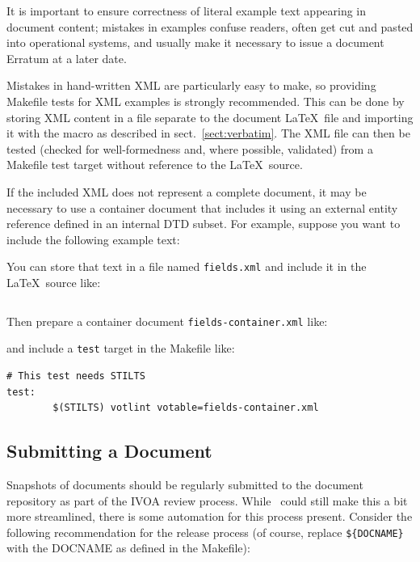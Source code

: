 \documentclass[11pt,a4paper]{ivoa}
\begin{document}
It is important to ensure correctness of literal example text appearing
in document content;
mistakes in examples confuse readers,
often get cut and pasted into operational systems,
and usually make it necessary to issue a document Erratum at a later date.

Mistakes in hand-written XML are particularly easy to make,
so providing Makefile tests for XML examples is strongly recommended.
This can be done by storing XML content in a file separate to the
document \LaTeX\ file and importing it with the \verb||
macro as described in sect.~\ref{sect:verbatim}.
The XML file can then be tested (checked for well-formedness and,
where possible, validated) from a Makefile test target without reference
to the \LaTeX\ source.

If the included XML does not represent a complete document, it may be
necessary to use a container document that includes it using an
external entity reference defined in an internal DTD subset.
For example, suppose you want to include the following example text:

You can store that text in a file named \verb|fields.xml| and
include it in the \LaTeX\ source like:
\begin{lstlisting}[basicstyle=\footnotesize]

\end{lstlisting}
Then prepare a container document \verb|fields-container.xml| like:

and include a \verb|test| target in the Makefile like:
\begin{lstlisting}[basicstyle=\footnotesize]
# This test needs STILTS
test:
        $(STILTS) votlint votable=fields-container.xml
\end{lstlisting}


\subsection{Submitting a Document}

Snapshots of documents should be regularly submitted to the document
repository as part of the IVOA review process.  While \ivoatex~could
still make this a bit more streamlined, there is some automation for
this process present.  Consider the following recommendation for the
release process (of course, replace \verb|${DOCNAME}| with the DOCNAME
as defined in the Makefile):
\end{document}

